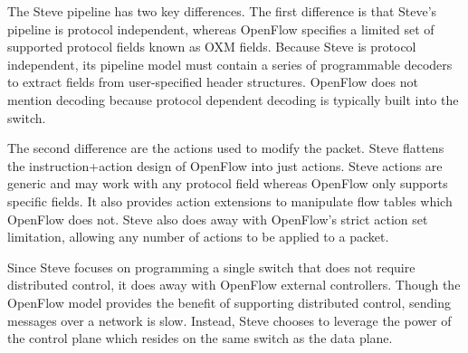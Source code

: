 The Steve pipeline has two key differences.
The first difference is that
Steve's pipeline is protocol independent, whereas OpenFlow specifies a limited set of
supported protocol fields known as OXM fields.
Because Steve is protocol independent, its
pipeline model must contain a series of programmable decoders to extract fields
from user-specified header structures. 
OpenFlow does not mention decoding because
protocol dependent decoding is typically built into the switch.

The second difference are the actions used to modify the packet.
Steve flattens the instruction+action design of OpenFlow into
just actions. Steve actions are generic and may work with any protocol field whereas OpenFlow only supports specific fields. It also provides action extensions to manipulate flow tables
which OpenFlow does not.
Steve also does away with OpenFlow's strict action set limitation, allowing any number of actions to be applied to a packet.

Since Steve focuses on programming a single switch that does not require distributed control, it does away with OpenFlow external controllers. 
Though the OpenFlow model provides
the benefit of supporting distributed control, sending messages
over a network is slow.
Instead, Steve chooses to leverage the power of the control plane which
resides on the same switch as the data plane.


%

